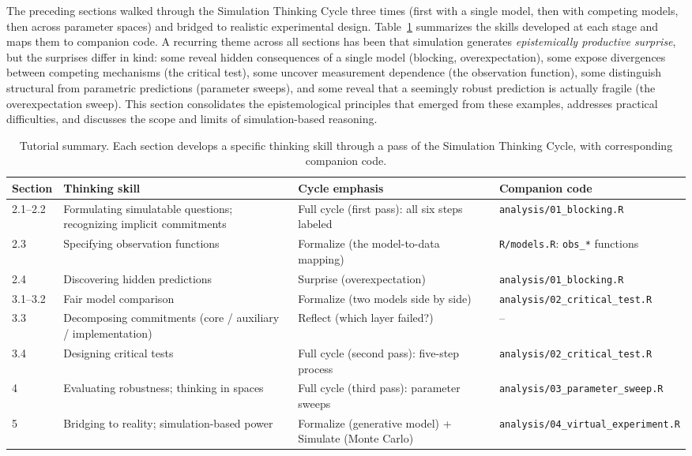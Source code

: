 \documentclass[fleqn,10pt]{wlscirep}
\begin{document}
\begin{linenumbers}
The preceding sections walked through the Simulation Thinking Cycle three times (first with a single model, then with competing models, then across parameter spaces) and bridged to realistic experimental design. Table~\ref{tab:summary} summarizes the skills developed at each stage and maps them to companion code. A recurring theme across all sections has been that simulation generates \emph{epistemically productive surprise}, but the surprises differ in kind: some reveal hidden consequences of a single model (blocking, overexpectation), some expose divergences between competing mechanisms (the critical test), some uncover measurement dependence (the observation function), some distinguish structural from parametric predictions (parameter sweeps), and some reveal that a seemingly robust prediction is actually fragile (the overexpectation sweep). This section consolidates the epistemological principles that emerged from these examples, addresses practical difficulties, and discusses the scope and limits of simulation-based reasoning.

\begin{table}[t]
\centering
\small
\caption{Tutorial summary. Each section develops a specific thinking skill through a pass of the Simulation Thinking Cycle, with corresponding companion code.}
\label{tab:summary}
\begin{tabular}{p{1.2cm}p{3.2cm}p{3.5cm}p{3.5cm}}
\toprule
\textbf{Section} & \textbf{Thinking skill} & \textbf{Cycle emphasis} & \textbf{Companion code} \\
\midrule
2.1--2.2 & Formulating simulatable questions; recognizing implicit commitments & Full cycle (first pass): all six steps labeled & \texttt{analysis/01\_blocking.R} \\
2.3 & Specifying observation functions & Formalize (the model-to-data mapping) & \texttt{R/models.R}: \texttt{obs\_*} functions \\
2.4 & Discovering hidden predictions & Surprise (overexpectation) & \texttt{analysis/01\_blocking.R} \\
3.1--3.2 & Fair model comparison & Formalize (two models side by side) & \texttt{analysis/02\_critical\_test.R} \\
3.3 & Decomposing commitments (core / auxiliary / implementation) & Reflect (which layer failed?) & -- \\
3.4 & Designing critical tests & Full cycle (second pass): five-step process & \texttt{analysis/02\_critical\_test.R} \\
4 & Evaluating robustness; thinking in spaces & Full cycle (third pass): parameter sweeps & \texttt{analysis/03\_parameter\_sweep.R} \\
5 & Bridging to reality; simulation-based power & Formalize (generative model) + Simulate (Monte Carlo) & \texttt{analysis/04\_virtual\_experiment.R} \\
\bottomrule
\end{tabular}
\end{table}


\end{linenumbers}
\end{document}

